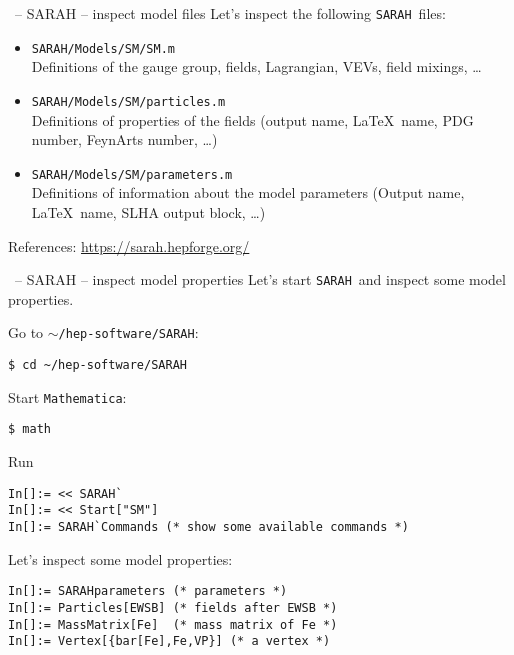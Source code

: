 \documentclass[11pt]{beamer}
\newcommand{\Mathematica}{\texttt{Mathematica}}
\newcommand{\SARAH}{\texttt{SARAH}}
\begin{document}

\begin{frame}[fragile]{\insertsection\ -- SARAH -- inspect model files}
  Let's inspect the following \SARAH\ files:
  \begin{itemize}
  \item \texttt{SARAH/Models/SM/SM.m}\\ Definitions of the gauge
    group, fields, Lagrangian, VEVs, field mixings, \ldots
  \item \texttt{SARAH/Models/SM/particles.m}\\
    Definitions of properties of the fields (output name, \LaTeX\
    name, PDG number, FeynArts number, \ldots)
  \item \texttt{SARAH/Models/SM/parameters.m}\\
    Definitions of information about the model parameters (Output
    name, \LaTeX\ name, SLHA output block, \ldots)
  \end{itemize}

  \bigskip

  References: \url{https://sarah.hepforge.org/}
\end{frame}


\begin{frame}[fragile]{\insertsection\ -- SARAH -- inspect model properties}
  Let's start \SARAH\ and inspect some model properties.
  
  Go to \texttt{$\sim$/hep-software/SARAH}:
  \begin{lstlisting}
$ cd ~/hep-software/SARAH\end{lstlisting}%
  Start \Mathematica:
  \begin{lstlisting}
$ math\end{lstlisting}%
  Run
  \begin{lstlisting}
In[]:= << SARAH`
In[]:= << Start["SM"]
In[]:= SARAH`Commands (* show some available commands *)\end{lstlisting}
  Let's inspect some model properties:
  \begin{lstlisting}
In[]:= SARAHparameters (* parameters *)
In[]:= Particles[EWSB] (* fields after EWSB *)
In[]:= MassMatrix[Fe]  (* mass matrix of Fe *)
In[]:= Vertex[{bar[Fe],Fe,VP}] (* a vertex *)\end{lstlisting}
\end{frame}
\end{document}
